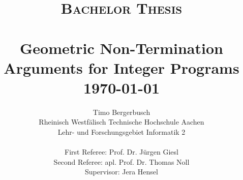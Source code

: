 
\title{ \normalsize \textsc{Bachelor Thesis}
	\\ [2.0cm]
	\HRule{0.5pt} \\
	\LARGE \textbf{Geometric Non-Termination Arguments for Integer Programs}
	\HRule{2pt} \\ [0.5cm]
	\normalsize \today \vspace*{5\baselineskip}}

\date{}

\author{
	Timo Bergerbusch\\ 
	Rheinisch Westfälisch Technische Hochschule Aachen \\
	Lehr- und Forschungsgebiet Informatik 2  \\ \\
	First Referee: Prof. Dr. Jürgen Giesl \\
	Second Referee: apl. Prof. Dr. Thomas Noll \\
	Supervisor: Jera Hensel
	}

\maketitle